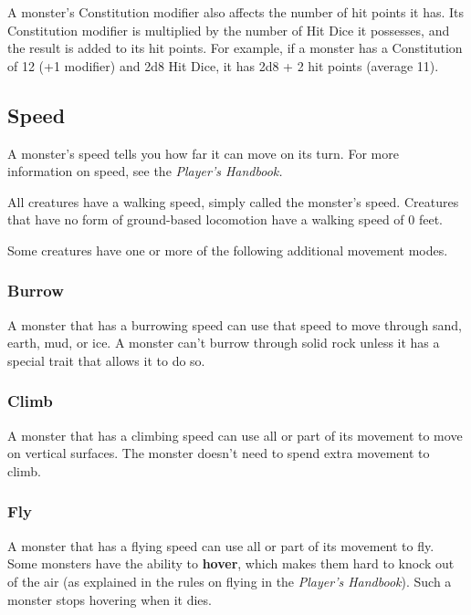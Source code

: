 \documentclass[
]{article}
\begin{document}
A monster's Constitution modifier also affects the number of hit points
it has. Its Constitution modifier is multiplied by the number of Hit
Dice it possesses, and the result is added to its hit points. For
example, if a monster has a Constitution of 12 (+1 modifier) and 2d8 Hit
Dice, it has 2d8 + 2 hit points (average 11).

\hypertarget{speed}{%
\subsection{Speed}\label{speed}}

A monster's speed tells you how far it can move on its turn. For more
information on speed, see the \emph{Player's Handbook.}

All creatures have a walking speed, simply called the monster's speed.
Creatures that have no form of ground-based locomotion have a walking
speed of 0 feet.

Some creatures have one or more of the following additional movement
modes.

\hypertarget{burrow}{%
\subsubsection{Burrow}\label{burrow}}

A monster that has a burrowing speed can use that speed to move through
sand, earth, mud, or ice. A monster can't burrow through solid rock
unless it has a special trait that allows it to do so.

\hypertarget{climb}{%
\subsubsection{Climb}\label{climb}}

A monster that has a climbing speed can use all or part of its movement
to move on vertical surfaces. The monster doesn't need to spend extra
movement to climb.

\hypertarget{fly}{%
\subsubsection{Fly}\label{fly}}

A monster that has a flying speed can use all or part of its movement to
fly. Some monsters have the ability to \textbf{hover}, which makes them
hard to knock out of the air (as explained in the rules on flying in the
\emph{Player's Handbook}). Such a monster stops hovering when it dies.
\end{document}
